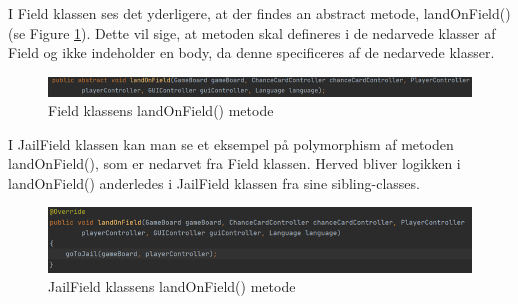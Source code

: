 \begin{flushleft}
I Field klassen ses det yderligere, at der findes an abstract metode, landOnField() (se Figure \ref{Field_landOnField}). Dette vil sige, at metoden skal defineres i de nedarvede klasser af Field og ikke indeholder en body, da denne specificeres af de nedarvede klasser.

\begin{figure}[H]
    \centering
    \includegraphics[width=14cm]{Report/figures/Codesections/Field_landOnField().png}
    \caption{Field klassens landOnField() metode}
    \label{Field_landOnField}
\end{figure}

I JailField klassen kan man se et eksempel på polymorphism af metoden landOnField(), som er nedarvet fra Field klassen. Herved bliver logikken i landOnField() anderledes i JailField klassen fra sine sibling-classes. 
    
\begin{figure}[H]
    \centering
    \includegraphics[width=14cm]{Report/figures/Codesections/BuyAbleField_landOnField().png}
    \caption{JailField klassens landOnField() metode}
    \label{Jailfield_landOnField}
\end{figure}


\end{flushleft}
